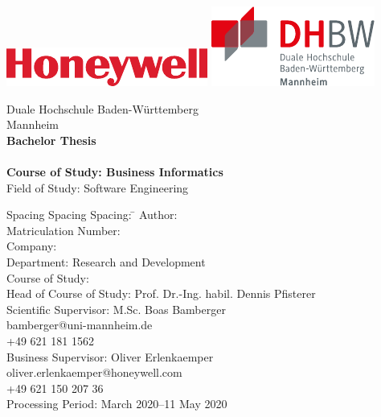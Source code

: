 \begin{titlepage}
\begin{minipage}{\textwidth}
		\vspace{-2cm}
		\noindent \includegraphics[scale=0.71]{img/firmenlogo.pdf} \hfill   \includegraphics{img/dhbwlogo.pdf}
\end{minipage}
\vspace{1em}
\sffamily
\begin{center}
	\textsf{\large{}Duale Hochschule Baden-W\"urttemberg\\[1.5mm] Mannheim}\\[2em]
	\textsf{\textbf{\Large{}Bachelor Thesis}}\\[3mm]
	\textsf{\textbf{\DerTitelDerArbeit}} \\[1.5cm]
	\textsf{\textbf{\Large{}Course of Study: Business Informatics}\\[3mm] \textsf{Field of Study: Software Engineering}}
	
\vfill

\begin{minipage}{\textwidth}

\begin{tabbing}
	Spacing Spacing Spacing: \hspace{0.85cm}\=\kill
	Author: \> \DerAutorDerArbeit \\[1.5mm]
	Matriculation Number:  \\[1.5mm]
	Company: \> \DerNameDerFirma  \\[1.5mm]
	Department: \> Research and Development \\[1.5mm]
	Course of Study: \> \DieKursbezeichnung \\[1.5mm]
	Head of Course of Study: \> Prof. Dr.-Ing. habil. Dennis Pfisterer  \\[1.5mm]
	Scientific Supervisor: \> M.Sc. Boas Bamberger  \\
	\> bamberger@uni-mannheim.de \\
	\> +49 621 181 1562 \\[1.5mm]
	Business Supervisor: \> Oliver Erlenkaemper \\
	\> oliver.erlenkaemper@honeywell.com \\
	\> +49 621 150 207 36 \\[1.5mm]
	Processing Period:  March 2020--11 May 2020 
\end{tabbing}
\end{minipage}

\end{center}

\end{titlepage}